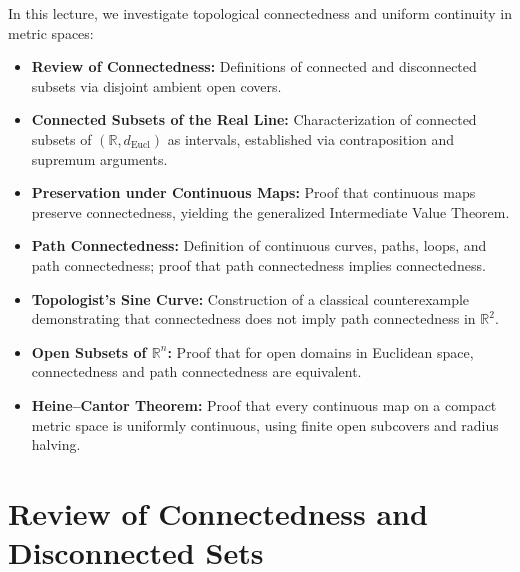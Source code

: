 \begin{overview}
In this lecture, we investigate topological connectedness and uniform continuity in metric spaces:
\begin{itemize}
    \item \textbf{Review of Connectedness:} Definitions of connected and disconnected subsets via disjoint ambient open covers.
    \item \textbf{Connected Subsets of the Real Line:} Characterization of connected subsets of $(\mathbb{R}, d_{\text{Eucl}})$ as intervals, established via contraposition and supremum arguments.
    \item \textbf{Preservation under Continuous Maps:} Proof that continuous maps preserve connectedness, yielding the generalized Intermediate Value Theorem.
    \item \textbf{Path Connectedness:} Definition of continuous curves, paths, loops, and path connectedness; proof that path connectedness implies connectedness.
    \item \textbf{Topologist's Sine Curve:} Construction of a classical counterexample demonstrating that connectedness does not imply path connectedness in $\mathbb{R}^2$.
    \item \textbf{Open Subsets of $\mathbb{R}^n$:} Proof that for open domains in Euclidean space, connectedness and path connectedness are equivalent.
    \item \textbf{Heine--Cantor Theorem:} Proof that every continuous map on a compact metric space is uniformly continuous, using finite open subcovers and radius halving.
\end{itemize}
\end{overview}

\section{Review of Connectedness and Disconnected Sets}


